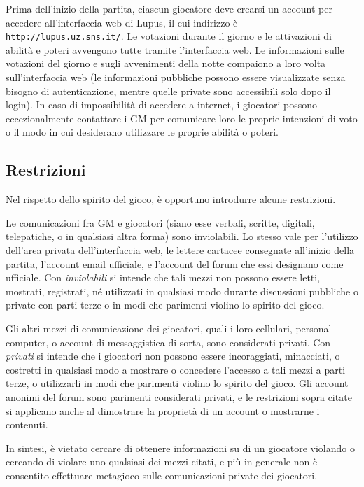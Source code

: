 \documentclass[a4paper,10pt]{article}
\begin{document}
Prima dell'inizio della partita, ciascun giocatore deve crearsi un account per accedere all'interfaccia web di Lupus, il cui indirizzo è \verb|http://lupus.uz.sns.it/|.
Le votazioni durante il giorno e le attivazioni di abilità e poteri avvengono tutte tramite l'interfaccia web. Le informazioni sulle votazioni del giorno e sugli avvenimenti della notte compaiono a loro volta sull'interfaccia web (le informazioni pubbliche possono essere visualizzate senza bisogno di autenticazione, mentre quelle private sono accessibili solo dopo il login). In caso di impossibilità di accedere a internet, i giocatori possono eccezionalmente contattare i GM per comunicare loro le proprie intenzioni di voto o il modo in cui desiderano utilizzare le proprie abilità o poteri.

\subsection{Restrizioni}

Nel rispetto dello spirito del gioco, è opportuno introdurre alcune restrizioni.

Le comunicazioni fra GM e giocatori (siano esse verbali, scritte, digitali, telepatiche, o in qualsiasi altra forma) sono inviolabili. Lo stesso vale per l'utilizzo dell'area privata dell'interfaccia web, le lettere cartacee consegnate all'inizio della partita, l'account email ufficiale, e l'account del forum che essi designano come ufficiale.
Con \emph{inviolabili} si intende che tali mezzi non possono essere letti, mostrati, registrati, né utilizzati in qualsiasi modo durante discussioni pubbliche o private con parti terze o in modi che parimenti violino lo spirito del gioco.

Gli altri mezzi di comunicazione dei giocatori, quali i loro cellulari, personal computer, o account di messaggistica di sorta, sono considerati privati.
Con \emph{privati} si intende che i giocatori non possono essere incoraggiati, minacciati, o costretti in qualsiasi modo a mostrare o concedere l'accesso a tali mezzi a parti terze, o utilizzarli in modi che parimenti violino lo spirito del gioco. Gli account anonimi del forum sono parimenti considerati privati, e le restrizioni sopra citate si applicano anche al dimostrare la proprietà di un account o mostrarne i contenuti.

In sintesi, è vietato cercare di ottenere informazioni su di un giocatore violando o cercando di violare uno qualsiasi dei mezzi citati, e più in generale non è consentito effettuare metagioco sulle comunicazioni private dei giocatori.
\end{document}

